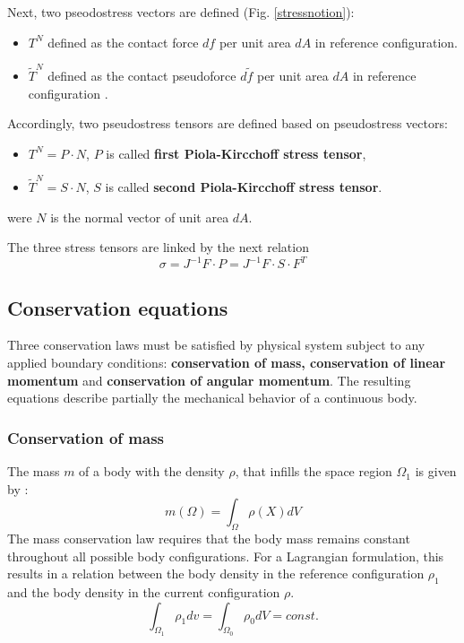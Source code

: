 Next, two pseodostress vectors are defined (Fig. \ref{stressnotion}):
\begin{itemize}
\item $T^N$ defined as the contact force $df$ per unit area $dA$ in reference configuration.
\item $\tilde{T}^N$ defined as the contact pseudoforce $d\tilde{f}$ per unit area $dA$ in reference configuration .  
\end{itemize}


Accordingly, two pseudostress tensors are defined based on pseudostress vectors:
\begin{itemize}
\item $T^N = P \cdot N$, $P$ is called \textbf{first Piola-Kircchoff stress tensor},
\item  $\tilde{T}^N = S \cdot N $, $S$ is called \textbf{second Piola-Kircchoff stress tensor}. 
\end{itemize} 
were $N$ is the normal vector of unit area $dA$.

The three stress tensors are linked by the next relation 
\begin{equation}
\sigma = J^{-1}F \cdot P = J^{-1} F \cdot S \cdot F^T
\label{PK12}
\end{equation}
\subsection{Conservation equations}\label{subsection:conservationequations}
Three conservation laws must be satisfied by physical system subject to any applied boundary conditions: \textbf{conservation of mass, conservation of linear momentum} and \textbf{conservation of angular momentum}. The resulting equations describe partially the mechanical behavior of a continuous body.

\subsubsection*{ Conservation of mass}
The mass $m$ of a body with the density $\rho$, that infills the space region $\Omega_1$ is given by :
\begin{equation}
m(\Omega) = \int_{\Omega} \rho(X)dV
\end{equation}
The mass conservation law requires that the body mass remains constant throughout all possible body configurations. For a Lagrangian formulation, this results in a relation between the body density in the reference configuration $\rho_1$ and the body density in the current configuration $\rho$.
$$\int_{\Omega_1} \rho_1 dv = \int_{\Omega_0} \rho_0 dV = const. $$

